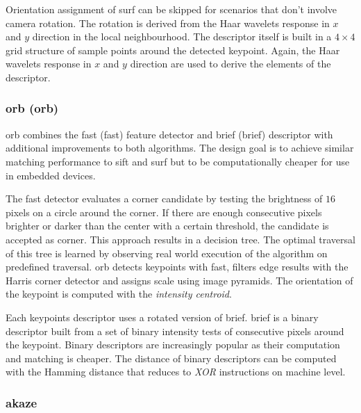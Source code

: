 Orientation assignment of \acrshort{surf} can be skipped for scenarios that don't involve camera rotation.
The rotation is derived from the Haar wavelets response in $x$ and $y$ direction in the local neighbourhood.
The descriptor itself is built in a $4\times4$ grid structure of sample points around the detected keypoint.
Again, the Haar wavelets response in $x$ and $y$ direction are used to derive the elements of the descriptor.

\subsubsection{\acrshort{orb} (\acrlong{orb})}

\acrshort{orb}\cite{rublee_iccv11} combines the \acrshort{fast}\cite{rosten_eccv06} (\acrlong{fast}) feature detector and \acrshort{brief}\cite{calonder_eccv10} (\acrlong{brief}) descriptor with additional improvements to both algorithms.
The design goal is to achieve similar matching performance to \acrshort{sift} and \acrshort{surf} but to be computationally cheaper for use in embedded devices.

The \acrshort{fast} detector evaluates a corner candidate by testing the brightness of $16$ pixels on a circle around the corner.
If there are enough consecutive pixels brighter or darker than the center with a certain threshold, the candidate is accepted as corner.
This approach results in a decision tree.
The optimal traversal of this tree is learned by observing real world execution of the algorithm on predefined traversal.
\acrshort{orb} detects keypoints with \acrshort{fast}, filters edge results with the Harris corner detector\cite{harris_1988} and assigns scale using image pyramids.
The orientation of the keypoint is computed with the \emph{intensity centroid}\cite{rosin_cviu99}.

Each keypoints descriptor uses a rotated version of \acrshort{brief}.
\acrshort{brief} is a binary descriptor built from a set of binary intensity tests of consecutive pixels around the keypoint.
Binary descriptors are increasingly popular as their computation and matching is cheaper.
The distance of binary descriptors can be computed with the Hamming distance that reduces to \emph{XOR} instructions on machine level.

\subsubsection{\acrshort{akaze}}

